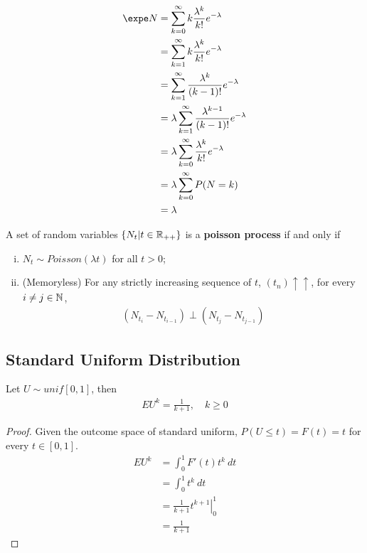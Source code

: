 \documentclass{article}
\begin{document}
   	\begin{theorem}
   		\begin{align}
   			\expe N &= \sum_{k=0}^\infty k \frac{\lambda^k}{k!} e^{-\lambda} \\
   			&= \sum_{k=1}^\infty k \frac{\lambda^k}{k!} e^{-\lambda} \\
   			&= \sum_{k=1}^\infty \frac{\lambda^k}{(k-1)!} e^{-\lambda}\\
   			&= \lambda \sum_{k=1}^\infty \frac{\lambda^{k-1}}{(k-1)!} e^{-\lambda}\\
   			&= \lambda \sum_{k=0}^\infty \frac{\lambda^{k}}{k!} e^{-\lambda}\\
   			&= \lambda \sum_{k=0}^\infty P(N=k) \\
   			&= \lambda
   		\end{align}
   	\end{theorem}
   	
   	\begin{definition}
   		A set of random variables $\{N_t | t \in \mathbb{R}_{++}\}$ is a \textbf{poisson process} if and only if
   		\begin{enumerate}[(i)]
   			\item $N_t \sim Poisson(\lambda t)$ for all $t > 0$;
   			\item (Memoryless) For any strictly increasing sequence of $t$, $(t_n)\uparrow \uparrow$, for every $i \neq j \in \mathbb{N}$,
   			\begin{align}
   				(N_{t_i} - N_{t_{i-1}})
   				\perp
   				(N_{t_j} - N_{t_{j-1}})
   			\end{align}
   		\end{enumerate}
   	\end{definition}
   	
   	\subsection{Standard Uniform Distribution}
   	
   	\begin{theorem}
   		Let $U \sim unif[0, 1]$, then
   		\begin{align}
   			E U^{k}=\frac{1}{k+1}, \quad k \geq 0
   		\end{align}
   	\end{theorem}
   	
   	\begin{proof}
   	Given the outcome space of standard uniform, $P(U \leq t) = F(t) = t$ for every $t \in [0, 1]$.
   		\begin{align}
   			EU^k &= \int_0^1 F'(t) t^k\ dt \\
   			&= \int_0^1 t^k\ dt\\
   			&= \left. \frac{1}{k+1} t^{k+1} \right|_0^1 \\
   			&= \frac{1}{k+1}
   		\end{align}
   	\end{proof}
   	
\end{document}
